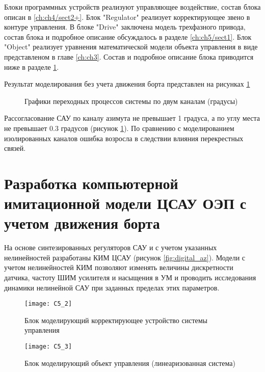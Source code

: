 Блоки программных устройств реализуют управляющее воздействие, состав блока описан в \ref{ch:ch4/sect2+}.
Блок "Regulator" реализует корректирующее звено в контуре управления.
В блоке "Drive" заключена модель трехфазного привода, состав блока и подробное описание обсуждалось в разделе \ref{ch:ch5/sect1}.
Блок "Object" реализует уравнения математической модели объекта управления в виде представленом в главе  \ref{ch:ch3}. Состав и подробное описание блока приводится ниже в разделе \ref{ch:ch5/sect3}.

Результат моделирования без учета движения борта представлен на рисунках \ref{fig:s5delta}


\begin{figure}[ht]%
	\centering
	\qquad
	\caption{Графики переходных процессов системы по двум каналам (градусы)}%
	\label{fig:s5delta}%
\end{figure}



Рассогласование САУ по каналу азимута не превышает 1 градуса, а по углу места не превышает 0.3 градусов (рисунок \ref{fig:s5delta}). По сравнению с моделированием изолированных каналов ошибка возросла в следствии влияния перекрестных связей.



\newpage

\section{Разработка компьютерной имитационной модели ЦСАУ ОЭП с учетом  движения борта} \label{ch:ch5/sect3}


На основе синтезированных регуляторов САУ и с учетом указанных нелинейностей разработаны КИМ ЦСАУ (рисунок \ref{fig:digital_az}). Модели с учетом нелинейностей КИМ позволяют изменять величины дискретности датчика, частоту ШИМ усилителя и насыщения в УМ и проводить исследования динамики нелинейной САУ при заданных пределах этих параметров. 
\begin{figure}[ht]
	\centering
	\texttt{[image: C5\_2]} 
	\caption{Блок моделирующий корректирующее устройство системы управления}
	\label{fig:coorection}
\end{figure}

\begin{figure}[ht]
	\centering
	\texttt{[image: C5\_3]} 
	\caption{Блок моделирующий объект управления (линеаризованная система)}
	\label{fig:object_lin}
\end{figure}

